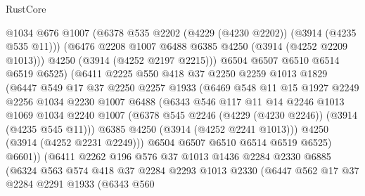 \begin{lexlean}{RustCore}
\begin{coremodule}
                    @1034
                    @676
                    @1007
                    (@6378 @535 @2202 (@4229 (@4230 @2202)) (@3914 (@4235 @535 @11)))
                    (@6476 @2208 @1007 @6488 @6385 @4250 (@3914 (@4252 @2209 @1013)))
                    @4250
                    (@3914 (@4252 @2197 @2215)))
                  @6504
                  @6507
                  @6510
                  @6514
                  @6519
                  @6525)
                (@6411
                  @2225
                  @550
                  @418
                  @37
                  @2250
                  @2259
                  @1013
                  @1829
                  (@6447
                    @549
                    @17
                    @37
                    @2250
                    @2257
                    @1933
                    (@6469
                      @548
                      @11
                      @15
                      @1927
                      @2249
                      @2256
                      @1034
                      @2230
                      @1007
                      @6488
                      (@6343
                        @546
                        @117
                        @11
                        @14
                        @2246
                        @1013
                        @1069
                        @1034
                        @2240
                        @1007
                        (@6378 @545 @2246 (@4229 (@4230 @2246)) (@3914 (@4235 @545 @11)))
                        @6385
                        @4250
                        (@3914 (@4252 @2241 @1013)))
                      @4250
                      (@3914 (@4252 @2231 @2249)))
                    @6504
                    @6507
                    @6510
                    @6514
                    @6519
                    @6525)
                  @6601))
              (@6411
                @2262
                @196
                @576
                @37
                @1013
                @1436
                @2284
                @2330
                @6885
                (@6324
                  @563
                  @574
                  @418
                  @37
                  @2284
                  @2293
                  @1013
                  @2330
                  (@6447
                    @562
                    @17
                    @37
                    @2284
                    @2291
                    @1933
                    (@6343
                      @560

\end{coremodule}
\end{lexlean}
